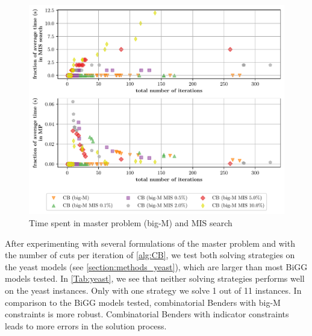 \begin{figure}[h!]
    \centering
    \includegraphics[width=1.0\textwidth]{Images/mis_comparison_time_vs_iterations_big_m.pdf}
    \caption{Time spent in master problem (big-M) and MIS search}
    \label{fig:mis_comparison_time_vs_iterations_big_m}
\end{figure}

\clearpage
After experimenting with several formulations of the master problem and with the number of cuts per iteration of \cref{alg:CB}, we test both solving strategies on the yeast models (see \cref{section:methods_yeast}), which are larger than most BiGG models tested. In \cref{Tab:yeast}, we see that neither solving strategies performs well on the yeast instances. Only with one strategy we solve 1 out of 11 instances. In comparison to the BiGG models tested, combinatorial Benders with big-M constraints is more robust. Combinatorial Benders with indicator constraints leads to more errors in the solution process. 

